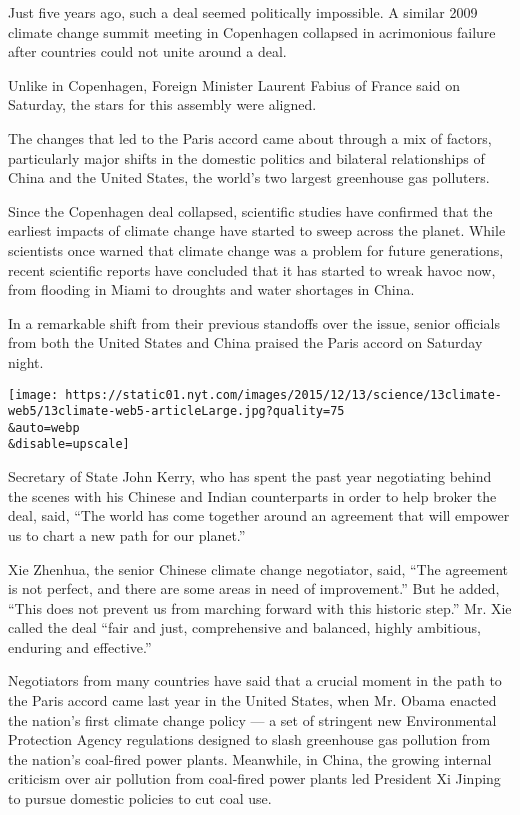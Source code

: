 Just five years ago, such a deal seemed politically impossible. A
similar 2009 climate change summit meeting in Copenhagen collapsed in
acrimonious failure after countries could not unite around a deal.

Unlike in Copenhagen, Foreign Minister Laurent Fabius of France said on
Saturday, the stars for this assembly were aligned.

The changes that led to the Paris accord came about through a mix of
factors, particularly major shifts in the domestic politics and
bilateral relationships of China and the United States, the world's two
largest greenhouse gas polluters.

Since the Copenhagen deal collapsed, scientific studies have confirmed
that the earliest impacts of climate change have started to sweep across
the planet. While scientists once warned that climate change was a
problem for future generations, recent scientific reports have concluded
that it has started to wreak havoc now, from flooding in Miami to
droughts and water shortages in China.

In a remarkable shift from their previous standoffs over the issue,
senior officials from both the United States and China praised the Paris
accord on Saturday night.

\texttt{[image: https://static01.nyt.com/images/2015/12/13/science/13climate-web5/13climate-web5-articleLarge.jpg?quality=75\\\&auto=webp\\\&disable=upscale]}

Secretary of State John Kerry, who has spent the past year negotiating
behind the scenes with his Chinese and Indian counterparts in order to
help broker the deal, said, ``The world has come together around an
agreement that will empower us to chart a new path for our planet.''

Xie Zhenhua, the senior Chinese climate change negotiator, said, ``The
agreement is not perfect, and there are some areas in need of
improvement.'' But he added, ``This does not prevent us from marching
forward with this historic step.'' Mr. Xie called the deal ``fair and
just, comprehensive and balanced, highly ambitious, enduring and
effective.''

Negotiators from many countries have said that a crucial moment in the
path to the Paris accord came last year in the United States, when Mr.
Obama enacted the nation's first climate change policy --- a set of
stringent new Environmental Protection Agency regulations designed to
slash greenhouse gas pollution from the nation's coal-fired power
plants. Meanwhile, in China, the growing internal criticism over air
pollution from coal-fired power plants led President Xi Jinping to
pursue domestic policies to cut coal use.

